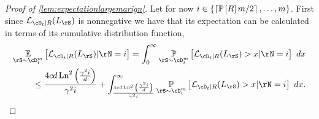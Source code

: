 \begin{proof}[Proof of \cref{lem:expectationlargemarign}]
    Let for now $ i\in \{\left\lceil\operatorname*{\mathbb{P}}\left[R\right]m/2\right\rceil,\ldots,m  \}  $. First since $ \ls_{\cD_{t}|R}(L_{\rS}) $ is nonnegative we have that its expectation can be calculated in terms of its cumulative distribution function,
    \begin{align}\label{eq:condtionalexpectation0}
     \e_{\rS\sim\cD_{t}^{m}}\left[\ls_{\cD_{t}|R}(L_{\rS})|\rN=i\right]=\int_{0}^{\infty}\p_{\rS\sim \cD_{t}^{m}}\left[\ls_{\cD_{t}|R}(L_{\rS})> x|\rN=i \right] \ dx\nonumber
     \\
     \leq \frac{4cd\Ln^{2}{\left( \frac{\gamma^{2}i}{d}\right)}}{\gamma^{2}i}+\int_{\frac{4cd\Ln^{2}{\left( \frac{\gamma^{2}i}{d}\right)}}{\gamma^{2}i}}^{\infty} \p_{\rS\sim\cD^{m}_{t}}\left[\ls_{\cD_{t}|R}(L_{\rS})> x|\rN=i \right] \ dx.
    \end{align} 


\end{proof}
